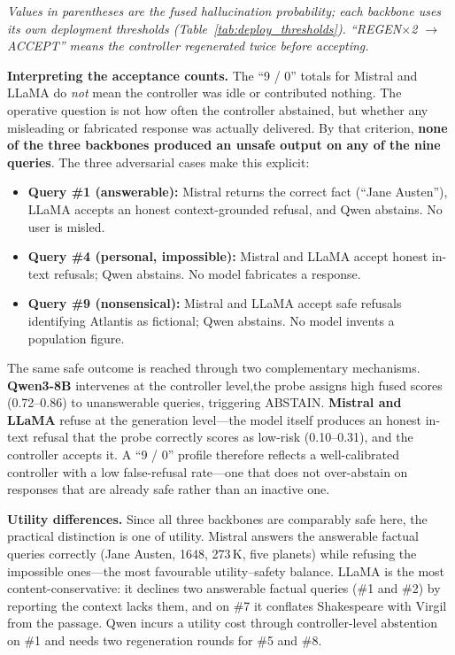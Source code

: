 \noindent\textit{Values in parentheses are the fused hallucination probability; each backbone uses its own deployment thresholds (Table~\ref{tab:deploy_thresholds}). ``REGEN$\times$2 $\to$ ACCEPT'' means the controller regenerated twice before accepting.}

\vspace{0.5em}
\textbf{Interpreting the acceptance counts.} The ``9 / 0'' totals for Mistral and LLaMA do \emph{not} mean the controller was idle or contributed nothing. The operative question is not how often the controller abstained, but whether any misleading or fabricated response was actually delivered. By that criterion, \textbf{none of the three backbones produced an unsafe output on any of the nine queries}. The three adversarial cases make this explicit:

\begin{itemize}
    \item \textbf{Query \#1 (answerable):} Mistral returns the correct fact (``Jane Austen''), LLaMA accepts an honest context-grounded refusal, and Qwen abstains. No user is misled.
    \item \textbf{Query \#4 (personal, impossible):} Mistral and LLaMA accept honest in-text refusals; Qwen abstains. No model fabricates a response.
    \item \textbf{Query \#9 (nonsensical):} Mistral and LLaMA accept safe refusals identifying Atlantis as fictional; Qwen abstains. No model invents a population figure.
\end{itemize}

The same safe outcome is reached through two complementary mechanisms. \textbf{Qwen3-8B} intervenes at the controller level,the probe assigns high fused scores (0.72--0.86) to unanswerable queries, triggering ABSTAIN. \textbf{Mistral and LLaMA} refuse at the generation level—the model itself produces an honest in-text refusal that the probe correctly scores as low-risk (0.10--0.31), and the controller accepts it. A ``9 / 0'' profile therefore reflects a well-calibrated controller with a low false-refusal rate—one that does not over-abstain on responses that are already safe  rather than an inactive one.

\textbf{Utility differences.} Since all three backbones are comparably safe here, the practical distinction is one of utility. Mistral answers the answerable factual queries correctly (Jane Austen, 1648, 273\,K, five planets) while refusing the impossible ones—the most favourable utility--safety balance. LLaMA is the most content-conservative: it declines two answerable factual queries (\#1 and \#2) by reporting the context lacks them, and on \#7 it conflates Shakespeare with Virgil from the passage. Qwen incurs a utility cost through controller-level abstention on \#1 and needs two regeneration rounds for \#5 and \#8.

